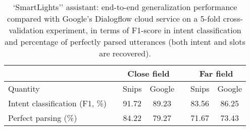 \documentclass{article}
\begin{document}
        \begin{table}[h]
    \centering
\begin{tabular}{@{}lcccccc@{}}
      \toprule
      \multicolumn{1}{c}{}       &  & \multicolumn{2}{c}{Close field} &  & \multicolumn{2}{c}{Far field} \\ \midrule
      Quantity                   &  & Snips          & Google         &  & Snips         & Google        \\ \cmidrule(r){1-1} \cmidrule(lr){3-4} \cmidrule(l){6-7}
      Intent classification (F1, \%) &  & 91.72          & 89.23           &  & 83.56          & 86.25          \\
      Perfect parsing (\%)       &  & 84.22           & 79.27           &  & 71.67          & 73.43          \\ \bottomrule
    \end{tabular}
    \vspace{0.2cm}
    \caption{`SmartLights'' assistant: end-to-end generalization performance compared with Google's Dialogflow cloud service on a 5-fold cross-validation experiment, in terms of F1-score in intent classification and percentage of perfectly parsed utterances (both intent and slots are recovered).}
    \label{tab:smart-lights-e2e-perf}
  \end{table}
\end{document}
